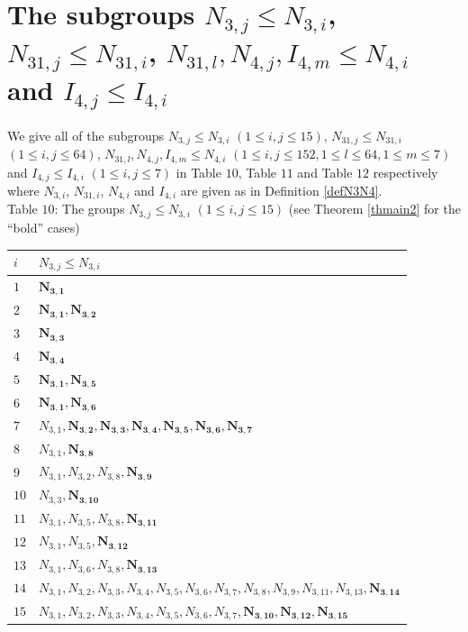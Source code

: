 \documentclass{amsart}
\theoremstyle{plain}
\theoremstyle{definition}
\theoremstyle{remark}
\newcounter{sub}\def\tr{\mbox{tr }}
\begin{document}
\section{The subgroups $N_{3,j}\leq N_{3,i}$, $N_{31,j}\leq N_{31,i}$, $N_{31,l}, N_{4,j}, I_{4,m}\leq N_{4,i}$ and $I_{4,j}\leq I_{4,i}$}\label{S3}

We give all of the subgroups 
$N_{3,j}\leq N_{3,i}$ $(1\leq i,j\leq 15)$, 
$N_{31,j}\leq N_{31,i}$ $(1\leq i,j\leq 64)$, 
$N_{31,l}, N_{4,j}, I_{4,m}\leq N_{4,i}$ $(1\leq i,j\leq 152, 1\leq l\leq 64, 1\leq m\leq 7)$ and 
$I_{4,j}\leq I_{4,i}$ $(1\leq i,j\leq 7)$ 
in Table $10$, Table $11$ and Table $12$ respectively 
where $N_{3,i}$, $N_{31,i}$, $N_{4,i}$ and $I_{4,i}$ are 
given as in Definition \ref{defN3N4}.\\ 

Table $10$: The groups $N_{3,j}\leq N_{3,i}$ $(1\leq i,j\leq15)$ 
(see Theorem \ref{thmain2} for the ``bold'' cases)%
{\small 
\begin{longtable}{ll}
$i$ & $N_{3,j}\leq N_{3,i}$\\\hline
\endfirsthead
%
$1$ & $\bm{N_{3,1}}$\\
$2$ & $\bm{N_{3,1}}, \bm{N_{3,2}}$\\
$3$ & $\bm{N_{3,3}}$\\
$4$ & $\bm{N_{3,4}}$\\
$5$ & $\bm{N_{3,1}}, \bm{N_{3,5}}$\\
$6$ & $\bm{N_{3,1}}, \bm{N_{3,6}}$\\
$7$ & $N_{3,1}, \bm{N_{3,2}}, \bm{N_{3,3}}, \bm{N_{3,4}}, \bm{N_{3,5}}, \bm{N_{3,6}}, \bm{N_{3,7}}$\\
$8$ & $N_{3,1}, \bm{N_{3,8}}$\\
$9$ & $N_{3,1}, N_{3,2}, N_{3,8}, \bm{N_{3,9}}$\\
$10$ & $N_{3,3}, \bm{N_{3,10}}$\\
$11$ & $N_{3,1}, N_{3,5}, N_{3,8}, \bm{N_{3,11}}$\\
$12$ & $N_{3,1}, N_{3,5}, \bm{N_{3,12}}$\\
$13$ & $N_{3,1}, N_{3,6}, N_{3,8}, \bm{N_{3,13}}$\\
$14$ & $N_{3,1}, N_{3,2}, N_{3,3}, N_{3,4}, N_{3,5}, N_{3,6}, N_{3,7}, N_{3,8}, N_{3,9}, N_{3,11}, N_{3,13}, \bm{N_{3,14}}$\\
$15$ & $N_{3,1}, N_{3,2}, N_{3,3}, N_{3,4}, N_{3,5}, N_{3,6}, N_{3,7}, \bm{N_{3,10}}, \bm{N_{3,12}}, \bm{N_{3,15}}$
\end{longtable}
}
\vspace*{2mm}
\end{document}
